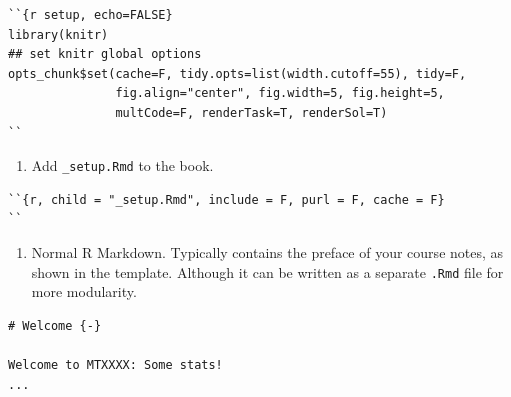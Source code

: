 \documentclass[
  british,
  oneside]{krantz}
\providecommand{\tightlist}{%
  \setlength{\itemsep}{0pt}\setlength{\parskip}{0pt}}
\theoremstyle{definition}
\theoremstyle{definition}
\theoremstyle{definition}
\theoremstyle{definition}
\theoremstyle{remark}
\begin{document}
\begin{itemize}
\begin{verbatim}
``{r setup, echo=FALSE}
library(knitr)
## set knitr global options
opts_chunk$set(cache=F, tidy.opts=list(width.cutoff=55), tidy=F, 
               fig.align="center", fig.width=5, fig.height=5,
               multCode=F, renderTask=T, renderSol=T)
``
\end{verbatim}

  \begin{enumerate}
  \def\labelenumi{\arabic{enumi}.}
  \setcounter{enumi}{2}
  \tightlist
  \item
    Add \texttt{\_setup.Rmd} to the book.
  \end{enumerate}

\begin{verbatim}
``{r, child = "_setup.Rmd", include = F, purl = F, cache = F}
``
\end{verbatim}

  \begin{enumerate}
  \def\labelenumi{\arabic{enumi}.}
  \setcounter{enumi}{3}
  \tightlist
  \item
    Normal R Markdown. Typically contains the preface of your course notes, as shown in the template.
    Although it can be written as a separate \texttt{.Rmd} file for more modularity.
  \end{enumerate}

\begin{verbatim}
# Welcome {-}

Welcome to MTXXXX: Some stats!
...
\end{verbatim}


\end{itemize}
\end{document}
